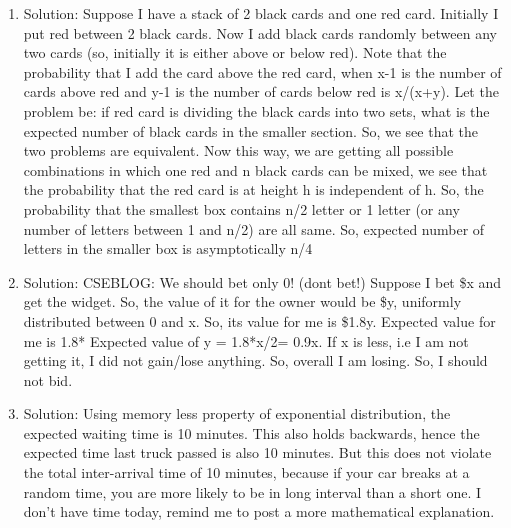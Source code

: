 \begin{enumerate}
\item
Solution: Suppose I have a stack of 2 black cards and one red card. Initially I put red between 2 black cards. Now I add black cards randomly between any two cards (so, initially it is either above or below red). Note that the probability that I add the card above the red card, when x-1 is the number of cards above red and y-1 is the number of cards below red is x/(x+y). Let the problem be: if red card is dividing the black cards into two sets, what is the expected number of black cards in the smaller section. So, we see that the two problems are equivalent.
Now this way, we are getting all possible combinations in which one red and n black cards can be mixed, we see that the probability that the red card is at height h is independent of h. So, the probability that the smallest box contains n/2 letter or 1 letter (or any number of letters between 1 and n/2) are all same. So, expected number of letters in the smaller box is asymptotically n/4




\item
Solution: CSEBLOG: We should bet only 0! (dont bet!) Suppose I bet \$x and get the widget. So, the value of it for the owner would be \$y, uniformly distributed between 0 and x. So, its value for me is \$1.8y. Expected value for me is 1.8* Expected value of y = 1.8*x/2= 0.9x.
If x is less, i.e I am not getting it, I did not gain/lose anything.
So, overall I am losing. So, I should not bid.




\item
Solution: Using memory less property of exponential distribution, the expected waiting time is 10 minutes. This also holds backwards, hence the expected time last truck passed is also 10 minutes. But this does not violate the total inter-arrival time of 10 minutes, because if your car breaks at a random time, you are more likely to be in long interval than a short one. I don't have time today, remind me to post a more mathematical explanation.




\end{enumerate}
